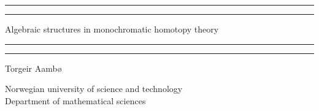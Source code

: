 
\begin{titlingpage}



    \vspace*{5cm}

    \rule[-11pt]{\textwidth}{1pt}
    \rule{\textwidth}{0.5pt}

    \begin{center}
    \Huge Algebraic structures in monochromatic homotopy theory
    \end{center}

    \rule{\textwidth}{0.5pt}
    \rule[11pt]{\textwidth}{1pt}


    \begin{center}
    Torgeir Aambø
    \end{center}



    \vspace{\fill}


    \begin{center}
        Norwegian university of science and technology \\
        Department of mathematical sciences 
    \end{center}


\end{titlingpage}